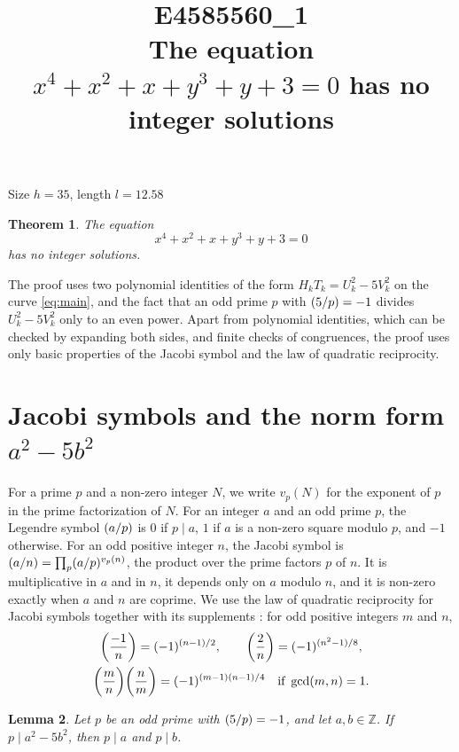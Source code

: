 \documentclass[11pt]{article}
\title{\textbf{E4585560\_1}\\[4pt] {\Large The equation $x^{4}+x^{2}+x+y^{3}+y+3=0$ has no integer solutions}}
\author{}
\date{}
\newtheorem{theorem}{Theorem}
\newtheorem{lemma}[theorem]{Lemma}
\newcommand{\Z}{\mathbb{Z}}
\newcommand{\leg}[2]{\mathchoice{\biggl(\dfrac{#1}{#2}\biggr)}{(#1/#2)}{(#1/#2)}{(#1/#2)}}
\begin{document}
\maketitle
\vspace{-8ex}
\begin{center}
Size $h=35$, length $l=12.58$
\end{center}

\begin{theorem}\label{thm:main}
The equation
\begin{equation}\label{eq:main}
x^{4}+x^{2}+x+y^{3}+y+3=0
\end{equation}
has no integer solutions.
\end{theorem}

The proof uses two polynomial identities of the form $H_kT_k=U_k^2-5V_k^2$ on the curve \eqref{eq:main}, and the fact that an odd prime $p$ with $\leg{5}{p}=-1$ divides $U_k^2-5V_k^2$ only to an even power. Apart from polynomial identities, which can be checked by expanding both sides, and finite checks of congruences, the proof uses only basic properties of the Jacobi symbol and the law of quadratic reciprocity.

\section{\texorpdfstring{Jacobi symbols and the norm form $a^2-5b^2$}{Jacobi symbols and the norm form}}

For a prime $p$ and a non-zero integer $N$, we write $v_p(N)$ for the exponent of $p$ in the prime factorization of $N$. For an integer $a$ and an odd prime $p$, the Legendre symbol $\leg{a}{p}$ is $0$ if $p\mid a$, $1$ if $a$ is a non-zero square modulo $p$, and $-1$ otherwise. For an odd positive integer $n$, the Jacobi symbol is $\leg{a}{n}=\prod_p\leg{a}{p}^{v_p(n)}$, the product over the prime factors $p$ of $n$. It is multiplicative in $a$ and in $n$, it depends only on $a$ modulo $n$, and it is non-zero exactly when $a$ and $n$ are coprime. We use the law of quadratic reciprocity for Jacobi symbols together with its supplements \cite[Chapter~5, \S2]{IR}: for odd positive integers $m$ and $n$,
\begin{gather*}
\leg{-1}{n}=(-1)^{(n-1)/2},\qquad\leg{2}{n}=(-1)^{(n^2-1)/8},\\
\leg{m}{n}\leg{n}{m}=(-1)^{(m-1)(n-1)/4}\quad\text{if }\gcd(m,n)=1.
\end{gather*}

\begin{lemma}\label{lem:divides}
Let $p$ be an odd prime with $\leg{5}{p}=-1$, and let $a,b\in\Z$. If $p\mid a^2-5b^2$, then $p\mid a$ and $p\mid b$.
\end{lemma}
\end{document}
